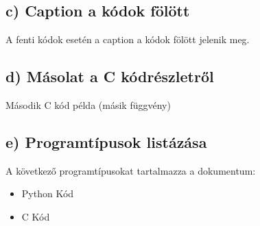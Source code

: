\documentclass[a4paper,12pt]{article}
\begin{document}
\subsection{c) Caption a kódok fölött}
A fenti kódok esetén a caption a kódok fölött jelenik meg.

\subsection{d) Másolat a C kódrészletről}
\begin{CCode}[H]
    \caption{Második C kód példa (másik függvény)}
\end{CCode}

\newpage

\subsection{e) Programtípusok listázása}
A következő programtípusokat tartalmazza a dokumentum:
\begin{itemize}
    \item Python Kód
    \item C Kód
\end{itemize}
\end{document}
